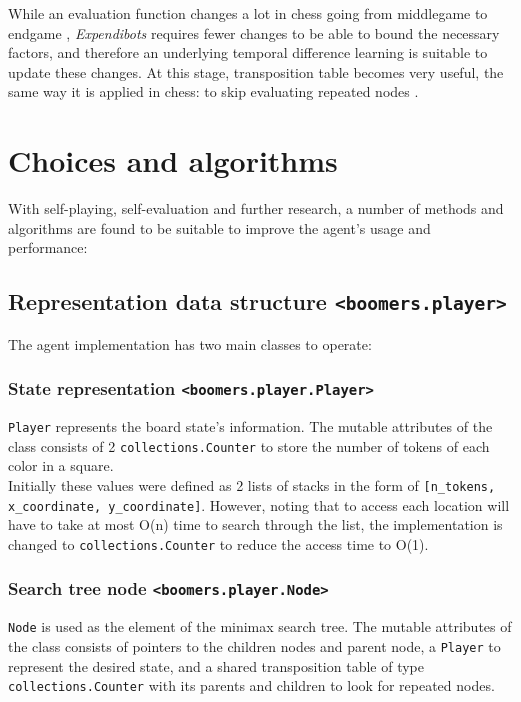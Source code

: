 \documentclass[]{article}
\newcommand{\gameName}{Expendibots}
\begin{document}
While an evaluation function changes a lot in chess going from middlegame to endgame \cite{phase}, \emph{\gameName} requires fewer changes to be able to bound the necessary factors, and therefore an underlying temporal difference learning is suitable to update these changes. At this stage, transposition table becomes very useful, the same way it is applied in chess: to skip evaluating repeated nodes \cite{table}.

\section{Choices and algorithms}

With self-playing, self-evaluation and further research, a number of methods and algorithms are found to be suitable to improve the agent's usage and performance:

\subsection{Representation data structure \texttt{<boomers.player>}}

The agent implementation has two main classes to operate:

\subsubsection{State representation \texttt{<boomers.player.Player>}}

\texttt{Player} represents the board state's information. The mutable attributes of the class consists of 2 \texttt{collections.Counter} to store the number of tokens of each color in a square.\\

Initially these values were defined as 2 lists of stacks in the form of \texttt{[n\_tokens, x\_coordinate, y\_coordinate]}. However, noting that to access each location will have to take at most O(n) time to search through the list, the implementation is changed to \texttt{collections.Counter} to reduce the access time to O(1).

\subsubsection{Search tree node \texttt{<boomers.player.Node>}}

\texttt{Node} is used as the element of the minimax search tree. The mutable attributes of the class consists of pointers to the children nodes and parent node, a \texttt{Player} to represent the desired state, and a shared transposition table of type \texttt{collections.Counter} with its parents and children to look for repeated nodes.\\
\end{document}
